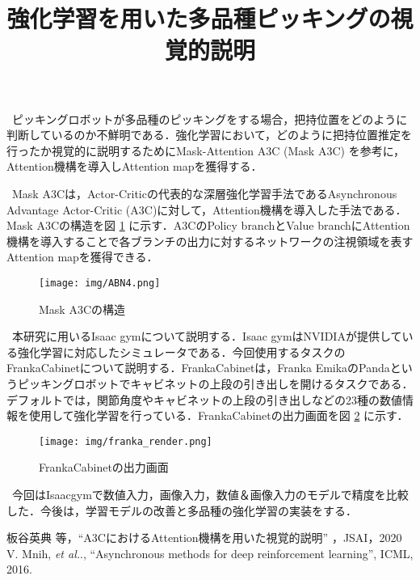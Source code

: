 \documentclass{jarticle}
\title{強化学習を用いた多品種ピッキングの視覚的説明}
\begin{document}
\maketitle

\ ピッキングロボットが多品種のピッキングをする場合，把持位置をどのように判断しているのか不鮮明である．強化学習において，どのように把持位置推定を行ったか視覚的に説明するためにMask-Attention A3C (Mask A3C) \cite{ref2} を参考に，Attention機構を導入しAttention mapを獲得する．

\ Mask A3Cは，Actor-Criticの代表的な深層強化学習手法であるAsynchronous Advantage Actor-Critic (A3C)\cite{ref3}に対して，Attention機構を導入した手法である．Mask A3Cの構造を図 \ref{mask} に示す．A3CのPolicy branchとValue branchにAttention機構を導入することで各ブランチの出力に対するネットワークの注視領域を表すAttention mapを獲得できる．

\begin{figure}[h]
\centering
	\texttt{[image: img/ABN4.png]}
	\vspace{-4mm}
	\caption{Mask A3Cの構造}
	\vspace{-2mm}
	\label{mask}
\end{figure}

\ 本研究に用いるIsaac gymについて説明する．Isaac gymはNVIDIAが提供している強化学習に対応したシミュレータである．今回使用するタスクのFrankaCabinetについて説明する．FrankaCabinetは，Franka EmikaのPandaというピッキングロボットでキャビネットの上段の引き出しを開けるタスクである．デフォルトでは，関節角度やキャビネットの上段の引き出しなどの23種の数値情報を使用して強化学習を行っている．FrankaCabinetの出力画面を図 \ref{render} に示す．

\begin{figure}[h]
\centering
	\texttt{[image: img/franka\_render.png]}
	\vspace{-4mm}
	\caption{FrankaCabinetの出力画面}
	\vspace{-2mm}
	\label{render}
\end{figure}

\ 今回はIsaacgymで数値入力，画像入力，数値＆画像入力のモデルで精度を比較した．今後は，学習モデルの改善と多品種の強化学習の実装をする．





\begin{thebibliography}{9}
	 板谷英典 等，``A3CにおけるAttention機構を用いた視覚的説明'' ，JSAI，2020
	V. Mnih, {\it et al.}., “Asynchronous methods for deep reinforcement learning”, ICML, 2016.
\end{thebibliography}


%
%
\end{document}

